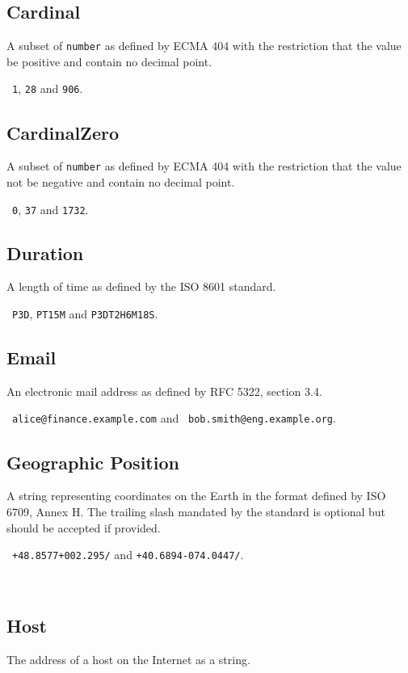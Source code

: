\documentclass[10pt]{article}
\begin{document}
\subsection{Cardinal}
A subset of {\tt number} as defined by ECMA 404 with the restriction
that the value be positive and contain no decimal point.

\example\ {\tt 1}, {\tt 28} and {\tt 906}.


\subsection{CardinalZero}
A subset of {\tt number} as defined by ECMA 404 with the restriction
that the value not be negative and contain no decimal point.

\example\ {\tt 0}, {\tt 37} and {\tt 1732}.



\subsection{Duration}
A length of time as defined by the ISO 8601 standard.

\example\ {\tt P3D}, {\tt PT15M} and {\tt P3DT2H6M18S}.


\subsection{Email}
An electronic mail address as defined by RFC 5322, section 3.4.

\example\ {\tt alice@finance.example.com} and {\tt
  bob.smith@eng.example.org}.



\subsection{Geographic Position}
A string representing coordinates on the Earth in the format defined
by ISO 6709, Annex H.  The trailing slash mandated by the standard is
optional but should be accepted if provided.

\example\ {\tt +48.8577+002.295/} and {\tt +40.6894-074.0447/}.

\\



\subsection{Host}
The address of a host on the Internet as a string.
\end{document}
